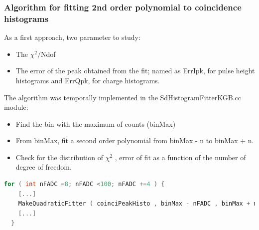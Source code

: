 \documentclass[aspectratio=169]{beamer}
\begin{document}
\begin{frame}[fragile]
  \frametitle{Algorithm for fitting 2nd order polynomial to
  coincidence histograms}
  As a first approach, two parameter to study:
  \vspace{0.2cm}

  \begin{itemize}
    \item The $\chi^2/$Ndof     
    \item The error of the peak obtained from the fit; named
      as ErrIpk, for pulse height histograms and ErrQpk, for
      charge histograms.
  \end{itemize}
  \vspace{0.2cm}

  The algorithm was temporally implemented in the
  SdHistogramFitterKGB.cc module:
  \vspace{0.1cm}
  \begin{itemize}
    \item Find the bin with the maximum of counts (binMax)
    \item From binMax, fit a second order polynomial from binMax - n to binMax + n.
    \item Check for the distribution of $\chi^2$ , error of fit
      as a function of the number of degree of freedom.
  \end{itemize}

  \begin{lstlisting}[language=C++, basicstyle = \ttfamily\tiny]
  for ( int nFADC =8; nFADC <100; nFADC +=4 ) {
    [...]
    MakeQuadraticFitter ( coinciPeakHisto , binMax - nFADC , binMax + nFADC ). GetFitData ( qf );
    [...]
  }
  \end{lstlisting}

\end{frame}
\end{document}
